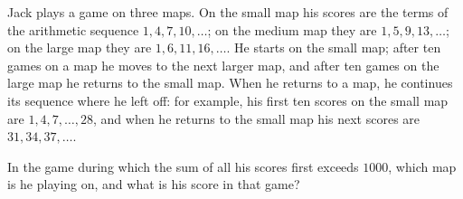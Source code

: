 Jack plays a game on three maps. On the small map his scores are the terms of the arithmetic sequence $1,4,7,10,\dots$; on the medium map they are $1,5,9,13,\dots$; on the large map they are $1,6,11,16,\dots$. He starts on the small map; after ten games on a map he moves to the next larger map, and after ten games on the large map he returns to the small map. When he returns to a map, he continues its sequence where he left off: for example, his first ten scores on the small map are $1,4,7,\dots,28$, and when he returns to the small map his next scores are $31,34,37,\dots$.

In the game during which the sum of all his scores first exceeds $1000$, which map is he playing on, and what is his score in that game?
